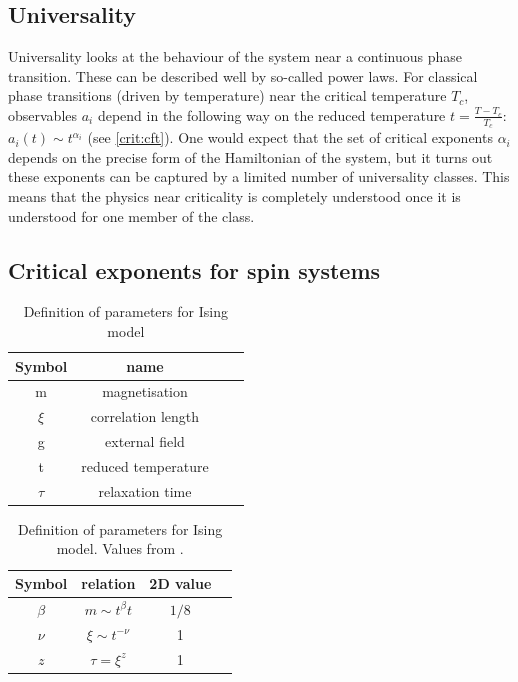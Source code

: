 \subsection{Universality}

Universality looks at the behaviour of the system near a continuous phase transition. These can be described well by so-called power laws. For classical phase transitions (driven by temperature) near the critical temperature $T_c$, observables $a_i$ depend in the following way on the reduced temperature $t=\frac{T-T_c}{T_c}$: $ a_i(t) \sim t^{\alpha_i}$ (see \cref{crit:cft}). One would expect that the set of critical exponents ${\alpha_i}$ depends on the precise form of the Hamiltonian of the system, but it turns out these exponents can be captured by a limited number of universality classes. This means that the physics near criticality is completely understood once it is understood for one member of the class.

\subsection{Critical exponents for spin systems}
\begin{table}[!ht]
    \centering
    \caption{Definition of parameters for Ising model}
    \begin{tabular}{c c c c}
        Symbol & name                \\
        \hline
        m      & magnetisation       \\
        $\xi$  & correlation length  \\
        g      & external field      \\
        t      & reduced temperature \\
        $\tau$ & relaxation time     \\
    \end{tabular}
    \label{isingtable}
\end{table}

\begin{table}[!ht]
    \centering
    \caption{Definition of parameters for Ising model. Values from \cite{Odor2004}.}
    \begin{tabular}{c c c c}
        Symbol  & relation             & 2D  value \\
        \hline
        $\beta$ & $m \sim t^{\beta} t$ & $1/8$     \\
        $\nu$   & $\xi \sim t^{-\nu}$  & 1         \\
        $z$     & $\tau = \xi^z$       & 1         \\
    \end{tabular}
    \label{isingtable2}
\end{table}

